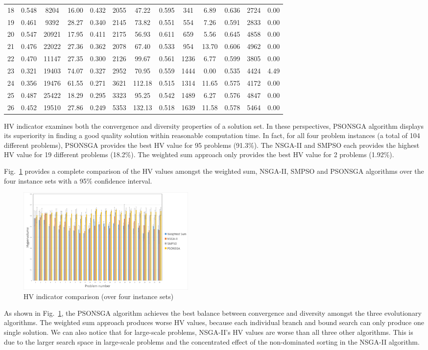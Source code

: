 \documentclass[10pt,journal,compsoc]{IEEEtran}
\newcommand{\Fig}[1]{Fig.~\ref{#1}}
\begin{document}
\begin{table}[H]
{\begin{tabular}{|*{13}{c|}}
18&0.548&8204&16.00&0.432&2055&47.22&0.595&341&6.89&0.636&2724&0.00\\
19&0.461&9392&28.27&0.340&2145&73.82&0.551&554&7.26&0.591&2833&0.00\\
20&0.547&20921&17.95&0.411&2175&56.93&0.611&659&5.56&0.645&4858&0.00\\
21&0.476&22022&27.36&0.362&2078&67.40&0.533&954&13.70&0.606&4962&0.00\\
22&0.470&11147&27.35&0.300&2126&99.67&0.561&1236&6.77&0.599&3805&0.00\\
23&0.321&19403&74.07&0.327&2952&70.95&0.559&1444&0.00&0.535&4424&4.49\\
24&0.356&19476&61.55&0.271&3621&112.18&0.515&1314&11.65&0.575&4172&0.00\\
25&0.487&25422&18.29&0.295&3323&95.25&0.542&1489&6.27&0.576&4847&0.00\\
26&0.452&19510&27.86&0.249&5353&132.13&0.518&1639&11.58&0.578&5464&0.00\\

\hline

\hline
\end{tabular}}
\end{table}
\fi
HV indicator examines both the convergence and diversity properties of a solution set. In these perspectives, PSONSGA algorithm displays its superiority in finding a good quality solution within reasonable computation time. In fact, for all four problem instances (a total of 104 different problems), PSONSGA provides the best HV value for 95 problems (91.3\%). The NSGA-II and SMPSO each provides the highest HV value for 19 different problems (18.2\%). The weighted sum approach only provides the best HV value for 2 problems (1.92\%).

\Fig{hvaverage} provides a complete comparison of the HV values amongst the weighted sum, NSGA-II, SMPSO and PSONSGA algorithms over the four instance sets with a 95\% confidence interval.
\begin{figure}[h]
\centerline{\includegraphics[page=1,width=3.5in]{hvaverageoverfour.png}}
\caption{HV indicator comparison (over four instance sets)} 
\label{hvaverage}
\end{figure}
As shown in \Fig{hvaverage}, the PSONSGA algorithm achieves the best balance between convergence and diversity amongst the three evolutionary algorithms. The weighted sum approach produces worse HV values, because each individual branch and bound search can only produce one single solution. We can also notice that for large-scale problems, NSGA-II's HV values are worse than all three other algorithms. This is due to the larger search space in large-scale problems and the concentrated effect of the non-dominated sorting in the NSGA-II algorithm.
\end{document}
